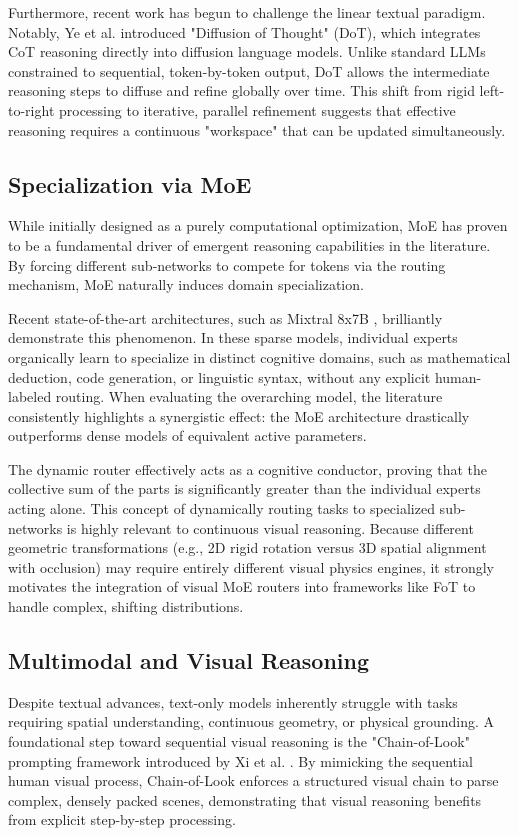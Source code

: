 \documentclass{l4proj}
\begin{document}
Furthermore, recent work has begun to challenge the linear textual paradigm. Notably, Ye et al. \cite{ye2024diffusion} introduced "Diffusion of Thought" (DoT), which integrates CoT reasoning directly into diffusion language models. Unlike standard LLMs constrained to sequential, token-by-token output, DoT allows the intermediate reasoning steps to diffuse and refine globally over time. This shift from rigid left-to-right processing to iterative, parallel refinement suggests that effective reasoning requires a continuous "workspace" that can be updated simultaneously.

\subsection{Specialization via MoE}
While initially designed as a purely computational optimization, MoE has proven to be a fundamental driver of emergent reasoning capabilities in the literature. By forcing different sub-networks to compete for tokens via the routing mechanism, MoE naturally induces domain specialization.

Recent state-of-the-art architectures, such as Mixtral 8x7B \citep{jiang2024mixtral}, brilliantly demonstrate this phenomenon. In these sparse models, individual experts organically learn to specialize in distinct cognitive domains, such as mathematical deduction, code generation, or linguistic syntax, without any explicit human-labeled routing. When evaluating the overarching model, the literature consistently highlights a synergistic effect: the MoE architecture drastically outperforms dense models of equivalent active parameters.

The dynamic router effectively acts as a cognitive conductor, proving that the collective sum of the parts is significantly greater than the individual experts acting alone. This concept of dynamically routing tasks to specialized sub-networks is highly relevant to continuous visual reasoning. Because different geometric transformations (e.g., 2D rigid rotation versus 3D spatial alignment with occlusion) may require entirely different visual physics engines, it strongly motivates the integration of visual MoE routers into frameworks like FoT to handle complex, shifting distributions.

\subsection{Multimodal and Visual Reasoning}
Despite textual advances, text-only models inherently struggle with tasks requiring spatial understanding, continuous geometry, or physical grounding. A foundational step toward sequential visual reasoning is the "Chain-of-Look" prompting framework introduced by Xi et al. \cite{xi2023chain}. By mimicking the sequential human visual process, Chain-of-Look enforces a structured visual chain to parse complex, densely packed scenes, demonstrating that visual reasoning benefits from explicit step-by-step processing.
\end{document}
